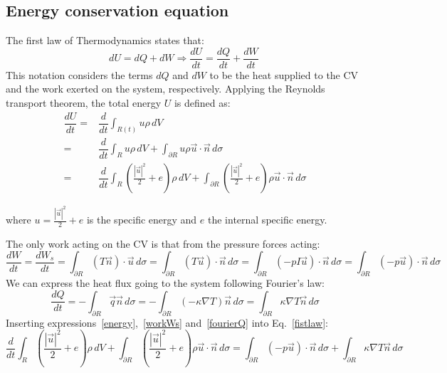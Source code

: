 \documentclass{article}
\begin{document}
\subsection{Energy conservation equation}

The first law of Thermodynamics states that:
\begin{equation}
\label{fistlaw}
    dU = dQ + dW\Rightarrow \dfrac{dU}{dt}=\dfrac{dQ}{dt}+\dfrac{dW}{dt}\ 
\end{equation}
This notation considers the terms $dQ$ and $dW$ to be the heat supplied to the CV and the work exerted on the system, respectively. Applying the Reynolds transport theorem, the total energy $U$ is defined as:
\begin{align}
\label{energy}
\dfrac{dU}{dt}=& \dfrac{d}{dt}\int_{R(t)}u\rho\,dV\nonumber\\ =& \dfrac{d}{dt}\int_{R}u\rho\,dV + \int_{\partial R}u\rho\vec{u}\cdot\vec{n}\,d\sigma\nonumber\\
=& \dfrac{d}{dt}\int_{R}\left(\frac{|\vec{u}|^2}{2}+e\right)\rho\,dV + \int_{\partial R}\left(\frac{|\vec{u}|^2}{2}+e\right)\rho\vec{u}\cdot\vec{n}\,d\sigma
\end{align}

where $u=\frac{|\vec{u}|^2}{2}+e$ is the specific energy and $e$ the internal specific energy.

The only work acting on the CV is that from the pressure forces acting:
\begin{equation}
\label{workWs}
    \dfrac{dW}{dt}=\dfrac{dW_s}{dt}=\int_{\partial R}(T\vec{n})\cdot\vec{u}\,d\sigma=\int_{\partial R}(T\vec{u})\cdot\vec{n}\,d\sigma=\int_{\partial R}(-pI\vec{u})\cdot\vec{n}\,d\sigma=\int_{\partial R}(-p\vec{u})\cdot\vec{n}\, d\sigma
\end{equation}
We can express the heat flux going to the system following Fourier's law:
\begin{equation}
\label{fourierQ}
    \dfrac{dQ}{dt}=-\int_{\partial R}\vec{q}\vec{n}\,d\sigma=-\int_{\partial R}(-\kappa \nabla T)\vec{n}\,d\sigma=\int_{\partial R}\kappa \nabla T\vec{n}\,d\sigma
\end{equation}
Inserting {expressions~\ref{energy},~\ref{workWs} and~\ref{fourierQ}} into {Eq.~\ref{fistlaw}}:
\begin{equation}
\dfrac{d}{dt}\int_{R}\left(\frac{|\vec{u}|^2}{2}+e\right)\rho\,dV + \int_{\partial R}\left(\frac{|\vec{u}|^2}{2}+e\right)\rho\vec{u}\cdot\vec{n}\,d\sigma=\int_{\partial R}(-p\vec{u})\cdot\vec{n}\, d\sigma+\int_{\partial R}\kappa \nabla T\vec{n}\,d\sigma
\end{equation}
\end{document}
